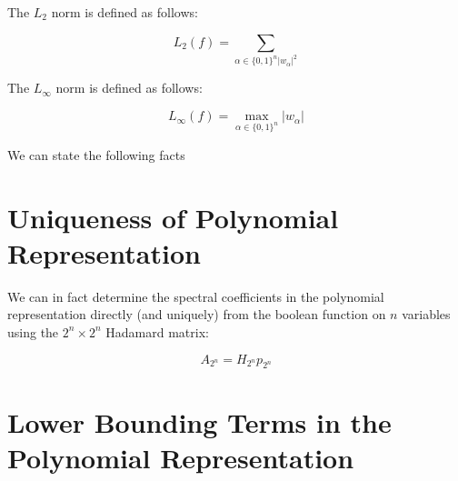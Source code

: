 \documentclass{article}
\begin{document}
The $L_2$ norm is defined as follows:

\begin{equation}
L_2(f) = \sum_{\alpha\in \{0,1\}^n |w_{\alpha}|^2}
\end{equation}

The $L_{\infty}$ norm is defined as follows:

\begin{equation}
L_{\infty}(f) = \max_{\alpha\in \{0,1\}^n} |w_\alpha|
\end{equation}

We can state the following facts

\section{Uniqueness of Polynomial Representation}

We can in fact determine the spectral coefficients in the polynomial 
representation directly (and uniquely) from the boolean function
on $n$ variables using the $2^n \times 2^n$ Hadamard matrix:

\begin{equation}
A_{2^n} = H_{2^n}p_{2^n}
\end{equation}

\section{Lower Bounding Terms in the Polynomial Representation}
\end{document}
